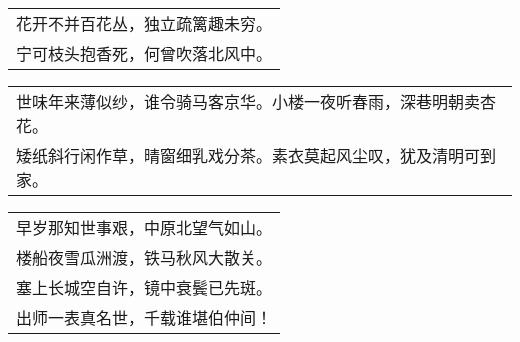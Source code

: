 \nopagebreak%
\nopagebreak%
\noindent\begin{minipage}{\linewidth}
  \vskip-3pt\begin{table}[H]
    \centering
    \begin{tabular}{@{}l@{}}
花开不并百花丛，独立疏篱趣未穷。\\
宁可枝头抱香死，何曾吹落北风中。
    \end{tabular}
  \end{table}
\end{minipage}
\vspace{1cm}


\nopagebreak%
\nopagebreak%
\noindent\begin{minipage}{\linewidth}
  \vskip-3pt\begin{table}[H]
    \centering
    \begin{tabular}{@{}l@{}}
世味年来薄似纱，谁令骑马客京华。小楼一夜听春雨，深巷明朝卖杏花。\\
矮纸斜行闲作草，晴窗细乳戏分茶。素衣莫起风尘叹，犹及清明可到家。
    \end{tabular}
  \end{table}
\end{minipage}
\vspace{1cm}


\nopagebreak%
\nopagebreak%
\noindent\begin{minipage}{\linewidth}
  \vskip-3pt\begin{table}[H]
    \centering
    \begin{tabular}{@{}l@{}}
早岁那知世事艰，中原北望气如山。\\
楼船夜雪瓜洲渡，铁马秋风大散关。\\
塞上长城空自许，镜中衰鬓已先斑。\\
出师一表真名世，千载谁堪伯仲间！
    \end{tabular}
  \end{table}
\end{minipage}
\vspace{1cm}


